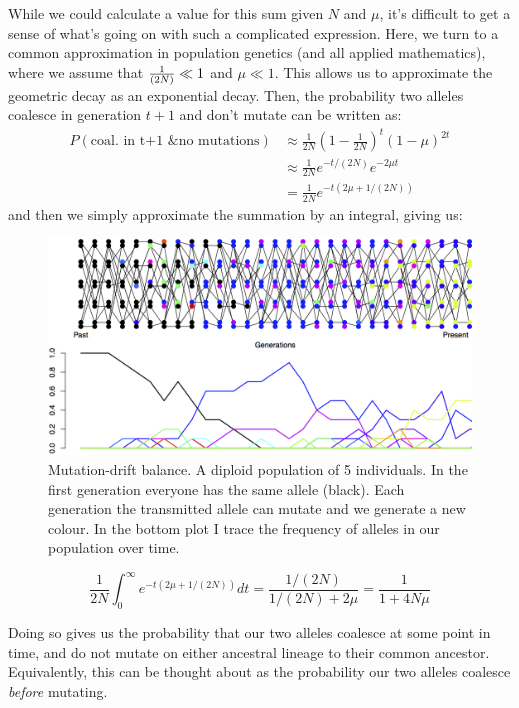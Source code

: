 While we could calculate a value for this sum given $N$ and $\mu$, it's
difficult to get a sense of what's going on with such a complicated expression.
Here, we turn to a common approximation in population genetics (and all applied
mathematics), where we assume that $\nicefrac{1}{(2N)} \ll 1$ and $\mu \ll 1$.
This allows us to approximate the geometric decay as an exponential decay.
Then, the probability two alleles coalesce in generation $t+1$ and don't mutate
can be written as:
%
\begin{align} P(\textrm{coal. in t+1 \& no mutations}) &\approx \frac{1}{2N}
\left(1- \frac{1}{2N} \right)^t \left(1-\mu \right)^{2t} \\ 
& \approx \frac{1}{2N} e^{-t/(2N)} e^{-2\mu t } \\
&=\frac{1}{2N} e^{-t(2\mu+1/(2N))} \end{align} 
%
and then we simply approximate the summation by an integral, giving us:
%
\begin{figure} \begin{center} \includegraphics[width= 0.8
\textwidth]{figures/Mut_drift_balance.png} \end{center} \caption{Mutation-drift
balance. A diploid population of 5 individuals. In the first generation
everyone has the same allele (black). Each generation the transmitted allele
can mutate and we generate a new colour. In the bottom plot I trace the
frequency of alleles in our population over time.} \label{fig:Mut_Sel_balance}
\end{figure} 

\begin{equation}
\frac{1}{2N} \int_0^{\infty} e^{-t(2\mu+1/(2N))} dt =
\frac{1/(2N)}{1/(2N)+2\mu} = \frac{1}{1+4N\mu}
\end{equation}

Doing so gives us the probability that our two alleles coalesce at some point
in time, and do not mutate on either ancestral lineage to their common
ancestor. Equivalently, this can be thought about as the probability our two
alleles coalesce \emph{before} mutating. 

